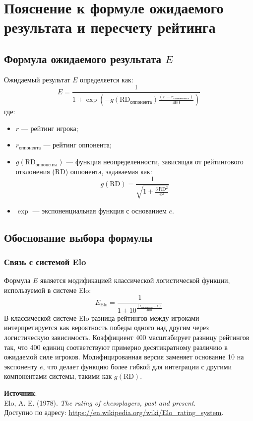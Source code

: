 \documentclass[12pt]{article}
\begin{document}
\section*{Пояснение к формуле ожидаемого результата и пересчету рейтинга}

\subsection*{Формула ожидаемого результата \(E\)}
Ожидаемый результат \(E\) определяется как:
\[
E = \frac{1}{1 + \exp\left(-g(\text{RD}_{\text{оппонента}})\frac{(r - r_{\text{оппонента}})}{400}\right)}
\]
где:
\begin{itemize}
    \item \(r\) --- рейтинг игрока;
    \item \(r_{\text{оппонента}}\) --- рейтинг оппонента;
    \item \(g(\text{RD}_{\text{оппонента}})\) --- функция неопределенности, зависящая от рейтингового отклонения (RD) оппонента, задаваемая как:
    \[
    g(\text{RD}) = \frac{1}{\sqrt{1 + \frac{3\,\text{RD}^2}{\pi^2}}}
    \]
    \item \(\exp\) --- экспоненциальная функция с основанием \(e\).
\end{itemize}

\subsection*{Обоснование выбора формулы}

\subsubsection*{Связь с системой Elo}
Формула \(E\) является модификацией классической логистической функции, используемой в системе Elo:
\[
E_{\text{Elo}} = \frac{1}{1 + 10^{\frac{(r_{\text{оппонента}} - r)}{400}}}
\]
В классической системе Elo разница рейтингов между игроками интерпретируется как вероятность победы одного над другим через логистическую зависимость. Коэффициент 400 масштабирует разницу рейтингов так, что 400 единиц соответствуют примерно десятикратному различию в ожидаемой силе игроков. Модифицированная версия заменяет основание 10 на экспоненту \(e\), что делает функцию более гибкой для интеграции с другими компонентами системы, такими как \(g(\text{RD})\).

\textbf{Источник}: \\
Elo, A. E. (1978). \textit{The rating of chessplayers, past and present}. \\
Доступно по адресу: \url{https://en.wikipedia.org/wiki/Elo_rating_system}.
\end{document}
